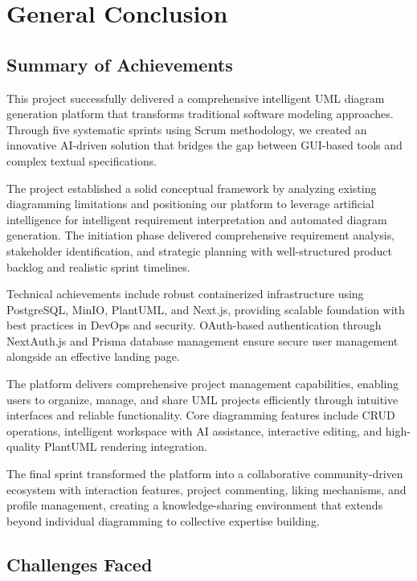 \chapter{General Conclusion}

\section{Summary of Achievements}

This project successfully delivered a comprehensive intelligent UML diagram generation platform that transforms traditional software modeling approaches. Through five systematic sprints using Scrum methodology, we created an innovative AI-driven solution that bridges the gap between GUI-based tools and complex textual specifications.

The project established a solid conceptual framework by analyzing existing diagramming limitations and positioning our platform to leverage artificial intelligence for intelligent requirement interpretation and automated diagram generation. The initiation phase delivered comprehensive requirement analysis, stakeholder identification, and strategic planning with well-structured product backlog and realistic sprint timelines.

Technical achievements include robust containerized infrastructure using PostgreSQL, MinIO, PlantUML, and Next.js, providing scalable foundation with best practices in DevOps and security. OAuth-based authentication through NextAuth.js and Prisma database management ensure secure user management alongside an effective landing page.

The platform delivers comprehensive project management capabilities, enabling users to organize, manage, and share UML projects efficiently through intuitive interfaces and reliable functionality. Core diagramming features include CRUD operations, intelligent workspace with AI assistance, interactive editing, and high-quality PlantUML rendering integration.

The final sprint transformed the platform into a collaborative community-driven ecosystem with interaction features, project commenting, liking mechanisms, and profile management, creating a knowledge-sharing environment that extends beyond individual diagramming to collective expertise building.

\section{Challenges Faced}

